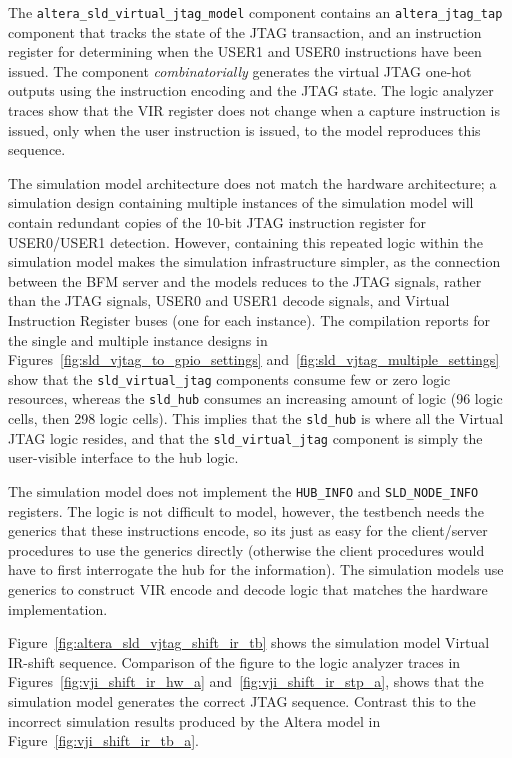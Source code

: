 \documentclass[10pt,twoside]{article}
\begin{document}
The \verb+altera_sld_virtual_jtag_model+ component contains an
\verb+altera_jtag_tap+ component that tracks the state of the
JTAG transaction, and an instruction register for determining
when the USER1 and USER0 instructions have been issued.
The component {\em combinatorially} generates the virtual
JTAG one-hot outputs using the instruction encoding and
the JTAG state. The logic analyzer traces show that the
VIR register does not change when a capture instruction is
issued, only when the user instruction is issued, to the
model reproduces this sequence. 

The simulation model architecture does not match the 
hardware architecture; a simulation design containing multiple
instances of the simulation model will contain redundant copies
of the 10-bit JTAG instruction register for USER0/USER1
detection. However, containing this repeated logic within the
simulation model makes the simulation infrastructure simpler,
as the connection between the BFM server and the models
reduces to the JTAG signals, rather than the JTAG signals, 
USER0 and USER1 decode signals, and Virtual Instruction
Register buses (one for each instance). The compilation reports
for the single and multiple instance designs in
Figures~\ref{fig:sld_vjtag_to_gpio_settings} 
and~\ref{fig:sld_vjtag_multiple_settings} show that
the \verb+sld_virtual_jtag+ components consume few or zero 
logic resources, whereas the \verb+sld_hub+ consumes an 
increasing amount of logic (96 logic cells, then 298 logic cells).
This implies that the \verb+sld_hub+ is where all the Virtual 
JTAG logic resides, and that the \verb+sld_virtual_jtag+ component is
simply the user-visible interface to the hub logic.

The simulation model does not implement the \verb+HUB_INFO+ and
\verb+SLD_NODE_INFO+ registers. The logic is not difficult
to model, however, the testbench needs the generics that these
instructions encode, so its just as easy for the client/server 
procedures to use the generics directly (otherwise the client
procedures would have to first interrogate the hub for the 
information). The simulation models use generics to construct
VIR encode and decode logic that matches the hardware 
implementation.

Figure~\ref{fig:altera_sld_vjtag_shift_ir_tb} shows the simulation
model Virtual IR-shift sequence. Comparison of the figure to
the logic analyzer traces in Figures~\ref{fig:vji_shift_ir_hw_a}
and~\ref{fig:vji_shift_ir_stp_a}, shows that the simulation
model generates the correct JTAG sequence. Contrast this to the
incorrect simulation results produced by the Altera model in
Figure~\ref{fig:vji_shift_ir_tb_a}.
\end{document}
